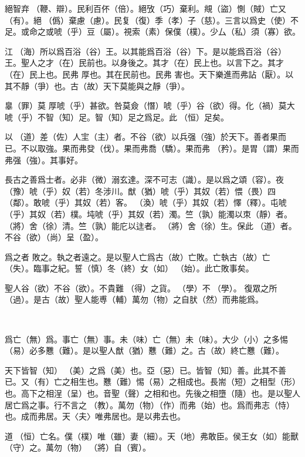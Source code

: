 \documentclass[a4paper]{ctexart}
\begin{document}
    絕智弃𠓥（鞭、辯）。民利百伓（倍）。絕攷（巧）棄利。覜（盜）惻（賊）亡又（有）。絕𢡺（僞）棄慮（慮）。民复（復）季（孝）子（慈）。三言以爲史（使）不足。或命之或唬（乎）豆（屬）。視索（素）保僕（樸）。少厶（私）須（寡）欲。

    江𣳠（海）所以爲百浴（谷）王。以其能爲百浴（谷）下。是以能爲百浴（谷）王。聖人之才（在）民前也。以身後之。其才（在）民上也。以言下之。其才（在）民上也。民弗 厚也。其在民前也。民弗 害也。天下樂進而弗詀（厭）。以其不靜（爭）也。古（故）天下莫能與之靜（爭）。

    辠（罪）莫 厚唬（乎）甚欲。咎莫僉（憯）唬（乎）谷（欲）得。化（禍）莫大唬（乎）不智（知）足。智（知）足之爲足。此𠄨（恒）足矣。

    以𧗟（道）差（佐）人宔（主）者。不谷（欲）以兵强（強）於天下。善者果而已。不以取強。果而弗癹（伐）。果而弗喬（驕）。果而弗 （矜）。是胃（謂）果而弗强（強）。其事好。

    長古之善爲士者。必非（微）溺玄達。深不可志（識）。是以爲之頌（容）。夜（豫）唬（乎）奴（若）冬涉川。猷（猶）唬（乎）其奴（若）愄（畏）四𠳵（鄰）。敢唬（乎）其奴（若）客。 （渙）唬（乎）其奴（若）懌（釋）。屯唬（乎）其奴（若）樸。坉唬（乎）其奴（若）濁。竺（孰）能濁以朿（靜）者。𨟻（將）舍（徐）清。竺（孰）能庀以迬者。𨟻（將）舍（徐）生。保此𧗟（道）者。不谷（欲）（尚）呈（盈）。

    爲之者 敗之。執之者遠之。是以聖人亡爲古（故）亡敗。亡執古（故）亡󶴡（失）。臨事之紀。誓（慎）冬（終）女（如） （始）。此亡敗事矣。

    聖人谷（欲）不谷（欲）。不貴難𠭁（得）之貨。𡥈（學）不𡥈（學）。 復眾之所（過）。是古（故）聖人能尃（輔）萬勿（物）之自肰（然）而弗能爲。

    𧗟（道）𠄨（恒）亡爲也。侯王能守之。而萬勿（物）𨟻（將）自𢡺（化）。𢡺（化）而𨿜（欲） （作）。𨟻（將）貞（鎮）之以亡名之 （樸）。夫亦𨟻（將）智（知）足。智（知）足以朿（靜）。萬勿（物）𨟻（將）自定。

    爲亡（無）爲。事亡（無）事。未（味）亡（無）未（味）。大少（小）之多惕（易）必多戁（難）。是以聖人猷（猶）戁（難）之。古（故）終亡戁（難）。

    天下皆智（知）𢼸（美）之爲（美）也。亞（惡）已。皆智（知）善。此其不善已。又（有）亡之相生也。戁（難）惕（易）之相成也。長耑（短）之相型（形）也。高下之相浧（呈）也。音聖（聲）之相和也。先後之相墮（隨）也。是以聖人居亡爲之事。行不言之𡥈（教）。萬勿（物）（作）而弗（始）也。爲而弗志（恃）也。成而弗居。天〈夫〉唯弗居也。是以弗去也。

    道𠄨（恒）亡名。僕（樸）唯（雖）妻（細）。天（地）弗敢臣。侯王女（如）能獸（守）之。萬勿（物）𨟻（將）自（賓）。
\end{document}
